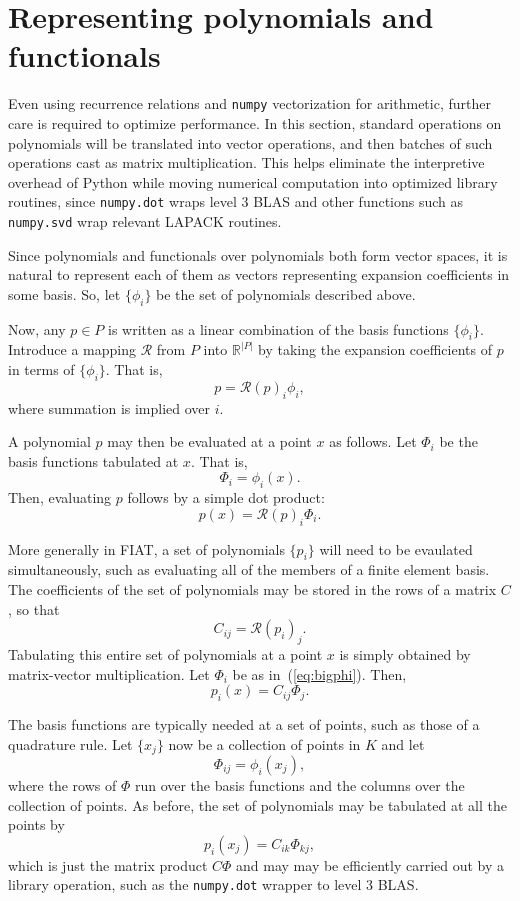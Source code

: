 \section{Representing polynomials and functionals}
Even using recurrence relations and \texttt{numpy} vectorization for
arithmetic, further care is required to optimize performance.  In this
section, standard 
operations on polynomials will be translated into vector operations, and
then batches of such operations cast as matrix multiplication.  This
helps eliminate the interpretive overhead of Python while moving
numerical computation into  optimized library routines, since 
\texttt{numpy.dot} wraps level 3 BLAS and other functions such as
\texttt{numpy.svd} wrap relevant LAPACK routines.

Since polynomials and
functionals over polynomials both form vector spaces, it is natural
to represent each of them as vectors representing expansion
coefficients in some basis.  So, let \( \{ \phi_i \} \) be the set of
polynomials described above.

Now, any \( p \in P \) is written as a linear combination of the basis
functions \( \{ \phi_i \} \).  Introduce a mapping \( \mathcal{R} \)
from \( P \) into \( \mathbb{R}^{|P|} \) by taking the expansion
coefficients of \( p \) in terms of \( \{ \phi_i \} \).  That is,
\[
p = \mathcal{R}(p)_i \phi_i,
\]
where summation is implied over \( i \).

A polynomial \( p \) may then be evaluated at a point \( x \) as
follows.  Let \( \Phi_i \) be the basis functions tabulated at \( x
\).  That is,
\begin{equation}
\label{eq:bigphi}
\Phi_i = \phi_i(x).
\end{equation}
Then, evaluating \( p \) follows by a simple dot product:
\begin{equation}
\label{eq:doteval}
p(x) = \mathcal{R}(p)_i \Phi_i.
\end{equation}

More generally in FIAT, a set of polynomials \( \{ p_i \} \) will need
to be evaulated simultaneously, such as evaluating all of the members
of a finite element basis.  
The coefficients of the set of
polynomials may be stored in the rows of a matrix \( C \), so
that
\[
C_{ij} = \mathcal{R}(p_i)_j.
\]
Tabulating this entire set of polynomials at a point \( x \) is simply
obtained by matrix-vector multiplication.  Let \( \Phi_i \) be as
in~(\ref{eq:bigphi}).  Then,
\[
p_i(x) = C_{ij} \Phi_j.
\]

The basis functions are typically needed at a set of points, such as
those of a quadrature rule.  Let \( \{
x_j \} \) now be a collection of points in \( K \) and let
\[
\Phi_{ij} = \phi_i(x_j),
\]
where the rows of \( \Phi \) run over the basis functions and the
columns over the collection of points.  As before, the set of
polynomials may be tabulated at all the points by
\[
p_i(x_j) = C_{ik} \Phi_{kj},
\]
which is just the matrix product \( C \Phi \) and may
may be efficiently carried out by a library operation,
such as the \texttt{numpy.dot} wrapper to level 3 BLAS.

